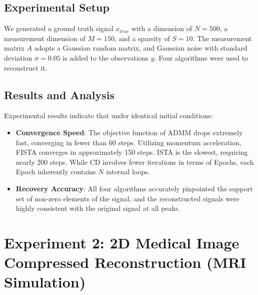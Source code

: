 \documentclass[12pt, a4paper]{article}
\begin{document}
\subsection{Experimental Setup}
We generated a ground truth signal $x_{true}$ with a dimension of $N=500$, a measurement dimension of $M=150$, and a sparsity of $S=10$. The measurement matrix $A$ adopts a Gaussian random matrix, and Gaussian noise with standard deviation $\sigma=0.05$ is added to the observations $y$. Four algorithms were used to reconstruct it.

\subsection{Results and Analysis}
Experimental results indicate that under identical initial conditions:
\begin{itemize}
    \item \textbf{Convergence Speed}: The objective function of ADMM drops extremely fast, converging in fewer than 60 steps. Utilizing momentum acceleration, FISTA converges in approximately 150 steps. ISTA is the slowest, requiring nearly 200 steps. While CD involves fewer iterations in terms of Epochs, each Epoch inherently contains $N$ internal loops.
    \item \textbf{Recovery Accuracy}: All four algorithms accurately pinpointed the support set of non-zero elements of the signal, and the reconstructed signals were highly consistent with the original signal at all peaks.
\end{itemize}

\section{Experiment 2: 2D Medical Image Compressed Reconstruction (MRI Simulation)}
\end{document}
